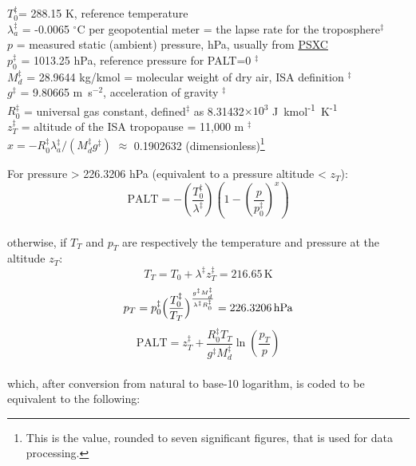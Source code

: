 \documentclass[
]{book}
\begin{document}
\(T_{0}^{\ddagger}\)= 288.15 K, reference temperature\\
\(\lambda_{a}^{\ddagger}\) =
-0.0065 \(^{\circ}\)C per geopotential meter = the lapse rate for the troposphere\(^{\ddagger}\)\\
\(p\) = measured static (ambient) pressure, hPa, usually from \protect\hyperlink{psx}{PSXC}\\
\(p_{0}^{\ddagger}\) = 1013.25 hPa, reference pressure for PALT=0 \(^{\ddagger}\)\\
\(M_{d}^{\ddagger}\) = 28.9644 kg/kmol = molecular weight of dry
air, ISA definition \(^{\ddagger}\)\\
\(g^{\ddagger}\) = 9.80665 m~s\(^{-2}\), acceleration of gravity \(^{\ddagger}\)\\
\(R_{0}^{\ddagger}\) = universal gas constant, defined\(^{\ddagger}\)
as 8.31432\(\times10^{3}\) J~kmol\textsuperscript{-1}~K\textsuperscript{-1}\\
\(z_{T}^{\ddagger}\) = altitude of the ISA tropopause = 11,000 m \(^{\ddagger}\)\\
\(x=-R_{0}^{\ddagger}\lambda_{a}^{\ddagger}/(M_{d}^{\ddagger}g^{\ddagger})\)
\(\approx\) 0.1902632 (dimensionless)\footnote{This is the value, rounded to seven significant figures, that is used for data processing.}

For pressure \textgreater{} 226.3206 hPa (equivalent to a pressure altitude \textless{} \(z_{T}\)):
\begin{equation}
\mathrm{PALT}=-\left(\frac{T_{0}^{\ddagger}}{\lambda^{\ddagger}}\right)\left(1-\left(\frac{p}{p_{0}^{\ddagger}}\right)^{x}\right)
\label{eq:PALT1}
\end{equation}\\
otherwise, if \(T_{T}\)
and \(p_{T}\)
are respectively the temperature and pressure at the altitude \(z_{T}\):\\
\[T_{T}=T_{0}+\lambda^{\ddagger}z_{T}^{\ddagger}=216.65\,\mathrm{K}\]
\[p_{T}=p_{0}^{\ddagger}\Bigl(\frac{T_{0}^{\ddagger}}{T_{T}}\Bigr)^{\frac{g^{\ddagger}M_{d}^{\ddagger}}{\lambda^{\ddagger}R_{0}^{\ddagger}}}=226.3206\,\mathrm{hPa}\]
\begin{equation}
\mathrm{PALT}=z_{T}^{\ddagger}+\frac{R_{0}^{\ddagger}T_{T}}{g^{\ddagger}M_{d}^{\ddagger}}\ln\left(\frac{p_{T}}{p}\right)
\label{eq:PALT2}
\end{equation}\\
which, after conversion from natural to base-10 logarithm, is coded
to be equivalent to the following:
\end{document}
